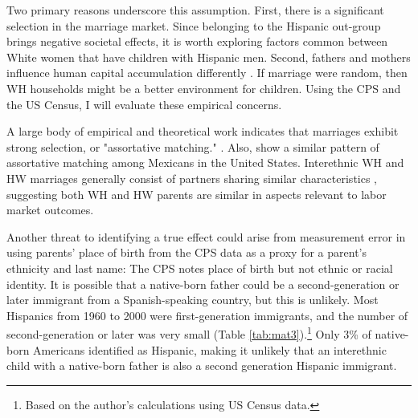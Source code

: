 Two primary reasons underscore this assumption. First, there is a significant selection in the marriage market. Since belonging to the Hispanic out-group brings negative societal effects, it is worth exploring factors common between White women that have children with Hispanic men. Second, fathers and mothers influence human capital accumulation differently \autocite{kimball2009risk,magruder2010intergenerational}. If marriage were random, then WH households might be a better environment for children. Using the CPS and the US Census, I will evaluate these empirical concerns.


A large body of empirical and theoretical work indicates that marriages exhibit strong selection, or "assortative matching." \autocite{averettBetterWorseRelationship2008, averettEconomicRealityBeauty1996, beckerTheoryMarriagePart1973, beckerTheoryMarriagePart1974, beckerTreatiseFamily1993, browningCollectiveUnitaryModels2006, chiapporiFatterAttractionAnthropometric2012}. Also, \textcite{duncanIntermarriageIntergenerationalTransmission2011} show a similar pattern of assortative matching among Mexicans in the United States. Interethnic WH and HW marriages generally consist of partners sharing similar characteristics , suggesting both WH and HW parents are similar in aspects relevant to labor market outcomes.

Another threat to identifying a true effect could arise from measurement error in using parents’ place of birth from the CPS data as a proxy for a parent’s ethnicity and last name: The CPS notes place of birth but not ethnic or racial identity. It is possible that a native-born father could be a second-generation or later immigrant from a Spanish-speaking country, but this is unlikely. Most Hispanics from 1960 to 2000  were first-generation immigrants, and the number of second-generation or later was very small (Table \ref{tab:mat3}).\footnote{Based on the author's calculations using US Census data.} Only 3\% of native-born Americans identified as Hispanic, making it unlikely that an interethnic child with a native-born father is also a second generation Hispanic immigrant. 

